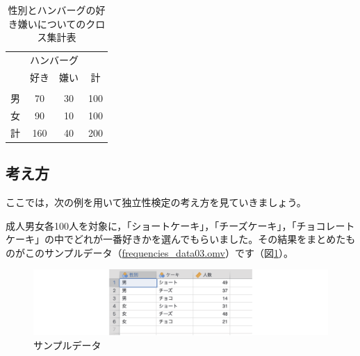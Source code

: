 \documentclass[
  12pt,
  a5jpaper,
  lualatex, ja=standard]{bxjsbook}
\begin{document}
\begin{table}[H]

\caption{\label{tab:frequencies-chisq-hamburg-table}性別とハンバーグの好き嫌いについてのクロス集計表}
\centering
\begin{tabular}[t]{lccc}
\toprule
\multicolumn{1}{c}{ } & \multicolumn{2}{c}{ハンバーグ} & \multicolumn{1}{c}{ } \\
\cmidrule(l{3pt}r{3pt}){2-3}
  & 好き & 嫌い & 計\\
\midrule
\addlinespace[0.3em]
\multicolumn{4}{l}{\textbf{性別}}\\
\hspace{1em}男 & 70 & 30 & 100\\
\hspace{1em}女 & 90 & 10 & 100\\
計 & 160 & 40 & 200\\
\bottomrule
\end{tabular}
\end{table}

\hypertarget{sub:frequencies-chisq-basics}{%
\subsection{考え方}\label{sub:frequencies-chisq-basics}}

ここでは，次の例を用いて独立性検定の考え方を見ていきましょう。

成人男女各100人を対象に，「ショートケーキ」，「チーズケーキ」，「チョコレートケーキ」の中でどれが一番好きかを選んでもらいました。その結果をまとめたものがこのサンプルデータ（\href{https://github.com/sbtseiji/jmv_compguide/raw/main/data/omv/frequencies_data03.omv}{frequencies\_data03.omv}）です（図\ref{fig:frequencies-data03}）。

\begin{figure}[!ht]

{\centering \includegraphics[width=1\linewidth]{images/frequencies/data03} 

}

\caption{サンプルデータ}\label{fig:frequencies-data03}
\end{figure}
\end{document}
